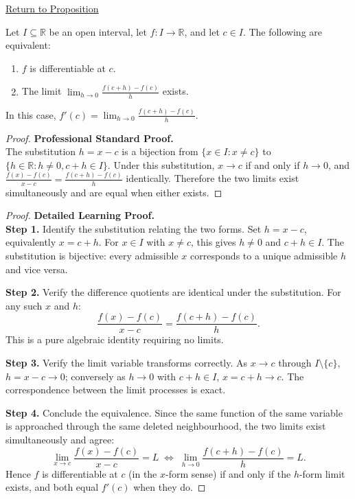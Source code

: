 \newpage
{}
\label{prf:derivative-h-form-equivalence}

\begin{remark*}[Return]
\hyperref[prop:derivative-h-form-equivalence]{Return to Proposition}
\end{remark*}

\begin{theorem*}
Let $I \subseteq \mathbb{R}$ be an open interval, let $f : I \to \mathbb{R}$, and let $c \in I$. The following are equivalent:
\begin{enumerate}
\item $f$ is differentiable at $c$.
\item The limit $\displaystyle\lim_{h \to 0} \frac{f(c + h) - f(c)}{h}$ exists.
\end{enumerate}
In this case, $\displaystyle f'(c) = \lim_{h \to 0} \frac{f(c + h) - f(c)}{h}$.
\end{theorem*}

\begin{proof}
\textbf{Professional Standard Proof.}~\\
The substitution $h = x - c$ is a bijection from $\{x \in I : x \neq c\}$ to $\{h \in \mathbb{R} : h \neq 0, c+h \in I\}$. Under this substitution, $x \to c$ if and only if $h \to 0$, and $\frac{f(x)-f(c)}{x-c} = \frac{f(c+h)-f(c)}{h}$ identically. Therefore the two limits exist simultaneously and are equal when either exists.
\end{proof}

\begin{proof}
\textbf{Detailed Learning Proof.}~\\

\textbf{Step 1.} Identify the substitution relating the two forms. Set $h = x - c$, equivalently $x = c + h$. For $x \in I$ with $x \neq c$, this gives $h \neq 0$ and $c + h \in I$. The substitution is bijective: every admissible $x$ corresponds to a unique admissible $h$ and vice versa.

\textbf{Step 2.} Verify the difference quotients are identical under the substitution. For any such $x$ and $h$:
\[
\frac{f(x) - f(c)}{x - c} = \frac{f(c + h) - f(c)}{h}.
\]
This is a pure algebraic identity requiring no limits.

\textbf{Step 3.} Verify the limit variable transforms correctly. As $x \to c$ through $I \setminus \{c\}$, $h = x - c \to 0$; conversely as $h \to 0$ with $c + h \in I$, $x = c + h \to c$. The correspondence between the limit processes is exact.

\textbf{Step 4.} Conclude the equivalence. Since the same function of the same variable is approached through the same deleted neighbourhood, the two limits exist simultaneously and agree:
\[
\lim_{x \to c} \frac{f(x)-f(c)}{x-c} = L
\;\iff\;
\lim_{h \to 0} \frac{f(c+h)-f(c)}{h} = L.
\]
Hence $f$ is differentiable at $c$ (in the $x$-form sense) if and only if the $h$-form limit exists, and both equal $f'(c)$ when they do.
\end{proof}

